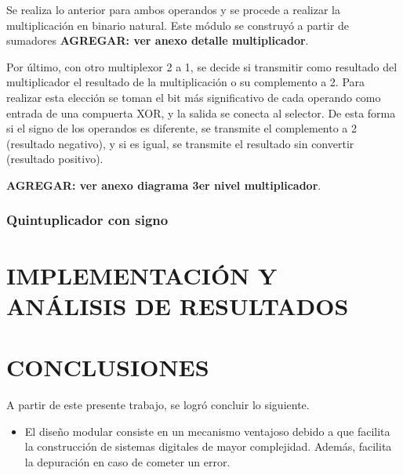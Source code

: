 \documentclass[journal,trans]{IEEEtran}
\begin{document}
Se realiza lo anterior para ambos operandos y se procede a realizar la multiplicación en binario natural. Este módulo se construyó a partir de sumadores \textbf{AGREGAR: ver anexo detalle multiplicador}.

Por último, con otro multiplexor 2 a 1, se decide si transmitir como resultado del multiplicador el resultado de la multiplicación o su complemento a 2. Para realizar esta elección se toman el bit más significativo de cada operando como entrada de una compuerta XOR, y la salida se conecta al selector. De esta forma si el signo de los operandos es diferente, se transmite el complemento a 2 (resultado negativo), y si es igual, se transmite el resultado sin convertir (resultado positivo).

\textbf{AGREGAR: ver anexo diagrama 3er nivel multiplicador}.


\subsubsection{Quintuplicador con signo}


\begin{comment}
Parte del problema por resolver consiste en el uso de componentes combinacionales, para lo cual se dispuso de un multiplexor de ocho entradas como el encargado de gobernar las operaciones.

se realizó una partición por módulos, lo cual consiste en estructurar la descripción del proyecto en secciones definidas, cada una con su respectivo proceso de diseño y codificación en el HDL Verilog.

Posteriormente se integró cada solución propuesta en un proyecto principal denominado main, al cual se le ajustaron los cambios correspondientes y se le agregó las distintas banderas como parte de las restricciones del proyecto.
\end{comment}

\section{IMPLEMENTACIÓN Y ANÁLISIS DE RESULTADOS}


\section{CONCLUSIONES}
A partir de este presente trabajo, se logró concluir lo siguiente.
\begin{itemize}
    \item El diseño modular consiste en un mecanismo ventajoso debido a que facilita la construcción de sistemas digitales de mayor complejidad. Además, facilita la depuración en caso de cometer un error.
\end{itemize}
\end{document}
